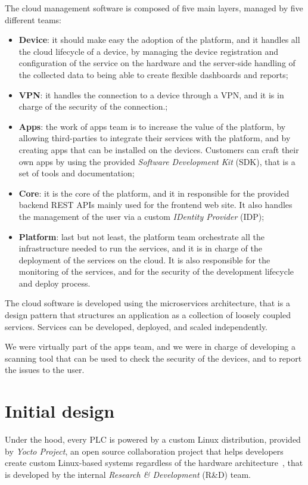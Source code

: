 The cloud management software is composed of five main layers, managed by five different teams:
\begin{itemize}
  \item \textbf{Device}: it should make easy the adoption of the platform, and it handles all the cloud lifecycle of a device, by managing the device registration and configuration of the service on the hardware and the server-side handling of the collected data to being able to create flexible dashboards and reports;
  \item \textbf{VPN}: it handles the connection to a device through a VPN, and it is in charge of the security of the connection.;
  \item \textbf{Apps}: the work of apps team is to increase the value of the platform, by allowing third-parties to integrate their services with the platform, and by creating apps that can be installed on the devices. Customers can craft their own apps by using the provided \textit{Software Development Kit} (SDK), that is a set of tools and documentation;
  \item \textbf{Core}: it is the core of the platform, and it in responsible for the provided backend REST APIs mainly used for the frontend web site. It also handles the management of the user via a custom \textit{IDentity Provider} (IDP);
  \item \textbf{Platform}: last but not least, the platform team orchestrate all the infrastructure needed to run the services, and it is in charge of the deployment of the services on the cloud. It is also responsible for the monitoring of the services, and for the security of the development lifecycle and deploy process.
\end{itemize}

The cloud software is developed using the microservices architecture, that is a design pattern that structures an application as a collection of loosely coupled services. Services can be developed, deployed, and scaled independently.

We were virtually part of the apps team, and we were in charge of developing a scanning tool that can be used to check the security of the devices, and to report the issues to the user.

\section{Initial design}

Under the hood, every PLC is powered by a custom Linux distribution, provided by \textit{Yocto Project}, an open source collaboration project that helps developers create custom Linux-based systems regardless of the hardware architecture~\cite{yocto-project}, that is developed by the internal \textit{Research \& Development} (R\&D) team.

